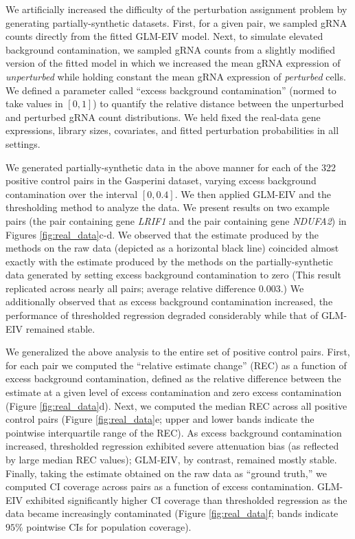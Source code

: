 \documentclass[11pt]{article}
\begin{document}
We artificially increased the difficulty of the perturbation assignment problem by generating partially-synthetic datasets. First, for a given pair, we sampled gRNA counts directly from the fitted GLM-EIV model. Next, to simulate elevated background contamination, we sampled gRNA counts from a slightly modified version of the fitted model in which we increased the mean gRNA expression of \textit{unperturbed} while holding constant the mean gRNA expression of \textit{perturbed} cells. We defined a parameter called ``excess background contamination'' (normed to take values in $[0,1]$) to quantify the relative distance between the unperturbed and perturbed gRNA count distributions.  We held fixed the real-data gene expressions, library sizes, covariates, and fitted perturbation probabilities in all settings.

We generated partially-synthetic data in the above manner for each of the 322 positive control pairs in the Gasperini dataset, varying excess background contamination over the interval $[0,0.4].$ We then applied GLM-EIV and the thresholding method to analyze the data. We present results on two example pairs (the pair containing gene \textit{LRIF1} and the pair containing gene \textit{NDUFA2}) in Figures \ref{fig:real_data}c-d. We observed that the estimate produced by the methods on the raw data (depicted as a horizontal black line) coincided almost exactly with the estimate produced by the methods on the partially-synthetic data generated by setting excess background contamination to zero (This result replicated across nearly all pairs; average relative difference $0.003$.) We additionally observed that as excess background contamination increased, the performance of thresholded regression degraded considerably while that of GLM-EIV remained stable.

We generalized the above analysis to the entire set of positive control pairs. First, for each pair we computed the ``relative estimate change'' (REC) as a function of excess background contamination, defined as the relative difference between the estimate at a given level of excess contamination and zero excess contamination (Figure \ref{fig:real_data}d). Next, we computed the median REC across all positive control pairs (Figure \ref{fig:real_data}e; upper and lower bands indicate the pointwise interquartile range of the REC). As excess background contamination increased, thresholded regression exhibited severe attenuation bias (as reflected by large median REC values); GLM-EIV, by contrast, remained mostly stable. Finally, taking the estimate obtained on the raw data as ``ground truth,'' we computed CI coverage across pairs as a function of excess contamination. GLM-EIV exhibited significantly higher CI coverage than thresholded regression as the data became increasingly contaminated (Figure \ref{fig:real_data}f; bands indicate $95\%$ pointwise CIs for population coverage). 
\end{document}
